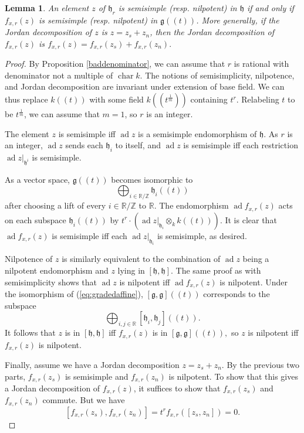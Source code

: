 \documentclass[12pt]{article}
\newcommand{\on}{\operatorname}
\newtheorem{lemma}[theorem]{Lemma}
\theoremstyle{remark}
\begin{document}
\begin{lemma}\label{semisimpleagreement}
    An element $z$ of $\mathfrak{h}_r$ is semisimple (resp. nilpotent) in $\mathfrak{h}$ if and only if $f_{x,r}(z)$ is semisimple (resp. nilpotent) in $\mathfrak{g}((t))$. More generally, if the Jordan decomposition of $z$ is $z=z_s+z_n$, then the Jordan decomposition of $f_{x,r}(z)$ is $f_{x,r}(z)=f_{x,r}(z_s)+f_{x,r}(z_n).$
\end{lemma}
\begin{proof}

    By Proposition \ref{baddenominator}, we can assume that $r$ is rational with denominator not a multiple of $\on{char} k$. The notions of semisimplicity, nilpotence, and Jordan decomposition are invariant under extension of base field. We can thus replace $k((t))$ with some field $k((t^\frac{1}{m}))$ containing $t^r$. Relabeling $t$ to be $t^{\frac{1}{m}}$, we can assume that $m=1$, so $r$ is an integer.
    
    The element $z$ is semisimple iff $\on{ad} z$ is a semisimple endomorphism of $\mathfrak{h}$. As $r$ is an integer, $\on{ad} z$ sends each $\mathfrak{h}_i$ to itself, and $\on{ad} z$ is semisimple iff each restriction $\on{ad} z|_{\mathfrak{h}^i}$ is semisimple.
    
    As a vector space, $\mathfrak{g}((t))$ becomes isomorphic to
    \begin{equation}\label{eq:gradedaffine}
    \displaystyle\bigoplus_{i\in\mathbb{R}/\mathbb{Z}}\mathfrak{h}_i((t))
    \end{equation}
    after choosing a lift of every $i\in\mathbb{R}/\mathbb{Z}$ to $\mathbb{R}.$ The endomorphism $\on{ad} f_{x,r}(z)$ acts on each subspace $\mathfrak{h}_i((t))$ by $t^r\cdot(\on{ad} z|_{\mathfrak{h}_i}\otimes_k k((t))).$ It is clear that $\on{ad} f_{x,r}(z)$ is semisimple iff each $\on{ad} z|_{\mathfrak{h}_i}$ is semisimple, as desired.
    
    Nilpotence of $z$ is similarly equivalent to the combination of $\on{ad} z$ being a nilpotent endomorphism and $z$ lying in $[\mathfrak{h},\mathfrak{h}].$ The same proof as with semisimplicity shows that $\on{ad} z$ is nilpotent iff $\on{ad} f_{x,r}(z)$ is nilpotent. Under the isomorphism of (\ref{eq:gradedaffine}), $[\mathfrak{g},\mathfrak{g}]((t))$ corresponds to the subspace
    \[
    \displaystyle\bigoplus_{i,j\in\mathbb{R}}[\mathfrak{h}_i,\mathfrak{h}_j]((t)).
    \]
    It follows that $z$ is in $[\mathfrak{h},\mathfrak{h}]$ iff $f_{x,r}(z)$ is in $[\mathfrak{g},\mathfrak{g}]((t)),$ so $z$ is nilpotent iff $f_{x,r}(z)$ is nilpotent.
    
    Finally, assume we have a Jordan decomposition $z=z_s+z_n$. By the previous two parts, $f_{x,r}(z_s)$ is semisimple and $f_{x,r}(z_n)$ is nilpotent. To show that this gives a Jordan decomposition of $f_{x,r}(z)$, it suffices to show that $f_{x,r}(z_s)$ and $f_{x,r}(z_n)$ commute. But we have
    \[
    [f_{x,r}(z_s),f_{x,r}(z_n)]=t^rf_{x,r}([z_s,z_n])=0.
    \]
\end{proof}
\end{document}
